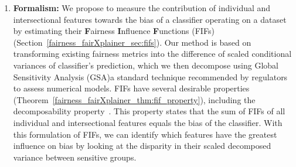 \begin{enumerate}
	
	\item \textbf{Formalism:} We propose to measure the contribution of individual and intersectional features towards the bias of a classifier operating on a dataset by estimating their \textbf{F}airness \textbf{I}nfluence \textbf{F}unctions (FIFs) (Section~\ref{fairness_fairXplainer_sec:fifs}). Our method is based on transforming existing fairness metrics into the difference of scaled conditional variances of classifier's prediction, which we then decompose using Global Sensitivity Analysis (GSA)\textemdash a standard technique recommended by regulators to assess numerical models\cite{eu,usepa}. FIFs have several desirable properties (Theorem~\ref{fairness_fairXplainer_thm:fif_property}), including the decomposability property~\cite{begley2020explainability,lundberg2020explaining}. This property states that the sum of FIFs of all individual and intersectional features equals the bias of the classifier. With this formulation of FIFs, we can identify which features have the greatest influence on bias by looking at the disparity in their scaled decomposed variance between sensitive groups.
	
	

\end{enumerate}

